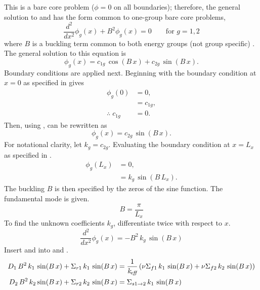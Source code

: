   This is a bare core problem ($\phi=0$ on all boundaries); therefore, the 
  general solution to  and  has the form common
  to one-group bare core problems,
  \begin{equation}
    \label{eq:multigroup_buckle}
    \frac{d^2}{dx^2} \phi_g(x) + B^2 \phi_g(x) = 0 \qquad \text{for } g=1,2
  \end{equation}
  where $B$ is a buckling term common to both energy groups (not group
  specific) \cite{textbookhenry}. The general solution to this equation is
  \begin{equation}
    \label{eq:multigroup_general}
    \phi_g(x) = c_{1g} \, \cos(B\,x) + c_{2g} \, \sin(B\,x).
  \end{equation}
  Boundary conditions are applied next. Beginning with the boundary condition at
  $x=0$ as specified in  gives
  \begin{align}
    \phi_g(0) &= 0, \\
    &= c_{1g}, \\
    \label{eq:1d2g_c1g}
    \therefore \; c_{1g} &= 0.
  \end{align}
  Then, using ,  can be rewritten 
  as
  \begin{equation}
    \label{eq:1d2g_sin}
    \phi_g(x) = c_{2g} \, \sin(B\,x).
  \end{equation}
  For notational clarity, let $k_g = c_{2g}$.
  Evaluating the boundary condition at $x=L_x$ as specified in
  .
  \begin{align}
    \phi_g(L_x) &= 0 ,\\
    &= k_g \, \sin(B \, L_x).
  \end{align}
  The buckling $B$ is then specified by the zeros of the sine function. The
  fundamental mode is given.
  \begin{equation}
    \label{eq:1d2g_buckle_geom}
    B = \frac{\pi}{L_x}
  \end{equation}
  To find the unknown coefficients $k_g$, differentiate 
  twice with respect to $x$.
  \begin{equation}
    \label{eq:1d2g_sin_d2}
    \frac{d^2}{dx^2} \phi_g(x) = - B^2 \, k_g \, \sin(B\,x)
  \end{equation}
  Insert  and  into  and
  .
  \begin{align}
    D_1 \, B^2 \, k_1 \, \sin(B\,x) + \Sigma_{r1} \, k_1 \, \sin(B\,x) &=
      \frac{1}{k_{\!\mbox{\scriptsize \em eff}}} \left( \nu \Sigma_{f1} \, k_1 \, \sin(B \, x) + \nu
      \Sigma_{f2} \, k_2 \, \sin(B\,x) \right) \\
    D_2 \, B^2 \, k_2 \sin(B\,x) + \Sigma_{r2} \, k_2 \, \sin(B\,x) &=
      \Sigma_{s 1\rightarrow 2} \, k_1 \, \sin(B\,x)
  \end{align}
